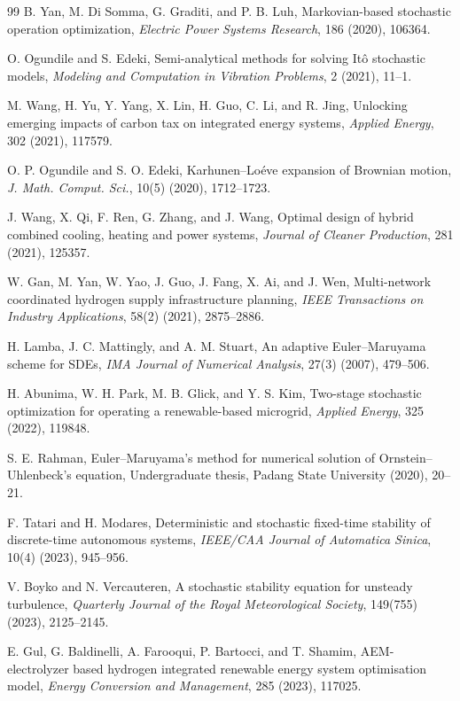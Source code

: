 \documentclass[11pt]{article}
\numberwithin{equation}{section}
\begin{document}
\begin{thebibliography}{99}
B. Yan, M. Di Somma, G. Graditi, and P. B. Luh,
Markovian-based stochastic operation optimization,
\emph{Electric Power Systems Research}, 186 (2020), 106364.

O. Ogundile and S. Edeki,
Semi-analytical methods for solving Itô stochastic models,
\emph{Modeling and Computation in Vibration Problems}, 2 (2021), 11--1.

M. Wang, H. Yu, Y. Yang, X. Lin, H. Guo, C. Li, and R. Jing,
Unlocking emerging impacts of carbon tax on integrated energy systems,
\emph{Applied Energy}, 302 (2021), 117579.

O. P. Ogundile and S. O. Edeki,
Karhunen--Loéve expansion of Brownian motion,
\emph{J. Math. Comput. Sci.}, 10(5) (2020), 1712--1723.

J. Wang, X. Qi, F. Ren, G. Zhang, and J. Wang,
Optimal design of hybrid combined cooling, heating and power systems,
\emph{Journal of Cleaner Production}, 281 (2021), 125357.

W. Gan, M. Yan, W. Yao, J. Guo, J. Fang, X. Ai, and J. Wen,
Multi-network coordinated hydrogen supply infrastructure planning,
\emph{IEEE Transactions on Industry Applications}, 58(2) (2021), 2875--2886.

H. Lamba, J. C. Mattingly, and A. M. Stuart,
An adaptive Euler--Maruyama scheme for SDEs,
\emph{IMA Journal of Numerical Analysis}, 27(3) (2007), 479--506.

H. Abunima, W. H. Park, M. B. Glick, and Y. S. Kim,
Two-stage stochastic optimization for operating a renewable-based microgrid,
\emph{Applied Energy}, 325 (2022), 119848.

S. E. Rahman,
Euler--Maruyama's method for numerical solution of Ornstein--Uhlenbeck's equation,
Undergraduate thesis, Padang State University (2020), 20--21.

F. Tatari and H. Modares,
Deterministic and stochastic fixed-time stability of discrete-time autonomous systems,
\emph{IEEE/CAA Journal of Automatica Sinica}, 10(4) (2023), 945--956.

V. Boyko and N. Vercauteren,
A stochastic stability equation for unsteady turbulence,
\emph{Quarterly Journal of the Royal Meteorological Society}, 149(755) (2023), 2125--2145.

E. Gul, G. Baldinelli, A. Farooqui, P. Bartocci, and T. Shamim,
AEM-electrolyzer based hydrogen integrated renewable energy system optimisation model,
\emph{Energy Conversion and Management}, 285 (2023), 117025.


\end{thebibliography}
\end{document}

